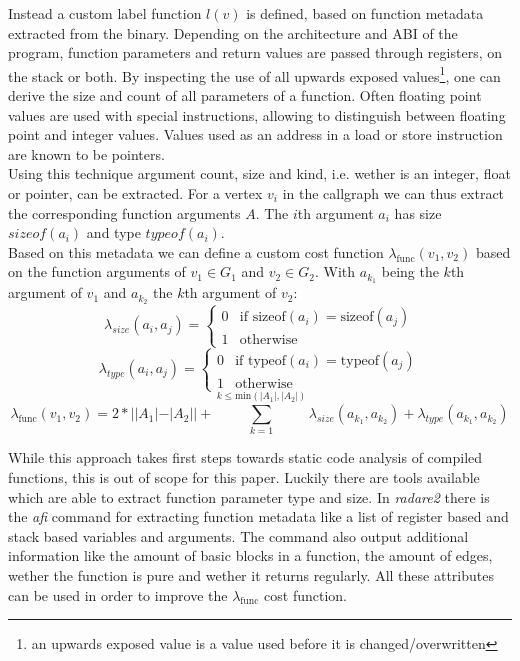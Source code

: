 \documentclass[
    12pt,                               %
    DIV=14,                     %
    parskip=half+,              %
    bigheadings,                %
    cleardoubleempty,   %
    halfparskip,                %
    ]{scrreprt} %
\begin{document}
Instead a custom label function $l(v)$ is defined, based on function metadata extracted from the binary. Depending on the architecture and ABI of the program, function parameters and return values are passed through registers, on the stack or both. By inspecting the use of all upwards exposed values\footnote{an upwards exposed value is a value used before it is changed/overwritten\cite{compilerbook, regalloc}}, one can derive the size and count of all parameters of a function. Often floating point values are used with special instructions, allowing to distinguish between floating point and integer values. Values used as an address in a load or store instruction are known to be pointers. \\
Using this technique argument count, size and kind, i.e. wether is an integer, float or pointer, can be extracted. For a vertex $v_i$ in the callgraph we can thus extract the corresponding function arguments $A$. The $i$th argument $a_i$ has size $sizeof(a_i)$ and type $typeof(a_i)$. \\
Based on this metadata we can define a custom cost function $\lambda_{\text{func}}(v_1, v_2)$ based on the function arguments of $v_1 \in G_1$ and $v_2 \in G_2$. With $a_{k_1}$ being the $k$th argument of $v_1$ and $a_{k_2}$ the $k$th argument of $v_2$:
\begin{equation}
	\lambda_{size}(a_i, a_j) = \begin{cases}
		0 & \text{if } \text{sizeof}(a_i) = \text{sizeof}(a_j) \\
		1 & \text{otherwise}
	\end{cases}
\end{equation}
\begin{equation}
	\lambda_{type}(a_i, a_j) = \begin{cases}
		0 & \text{if } \text{typeof}(a_i) = \text{typeof}(a_j) \\
		1 & \text{otherwise}
	\end{cases}
\end{equation}
\begin{equation}
	\lambda_{\text{func}}(v_1, v_2) = 2 * ||A_1| - |A_2|| + \sum_{k = 1}^{k \leq \text{min}(|A_1|, |A_2|)} \lambda_{size}(a_{k_1}, a_{k_2}) + \lambda_{type}(a_{k_1}, a_{k_2})
\end{equation}

While this approach takes first steps towards static code analysis of compiled functions, this is out of scope for this paper. Luckily there are tools available which are able to extract function parameter type and size. In \textit{radare2} there is the \textit{afi} command for extracting function metadata like a list of register based and stack based variables and arguments. The command also output additional information like the amount of basic blocks in a function, the amount of edges, wether the function is pure and wether it returns regularly. All these attributes can be used in order to improve the $\lambda_{\text{func}}$ cost function.
\end{document}
